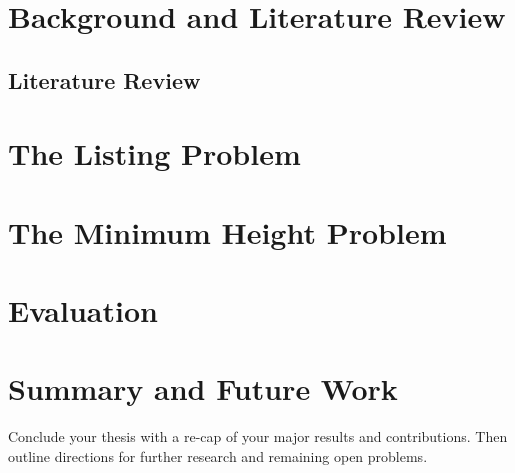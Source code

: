 \chapter{Background and Literature Review}
\label{chapter:background}
 


\section{Literature Review}


\chapter{The Listing Problem}  
\label{chapter:listingproblem}





\chapter{The Minimum Height Problem}
\label{chapter:minheightproblem}



\chapter{Evaluation}  
\label{chapter:evaluation}



\chapter{Summary and Future Work}
\label{chapter:summary}

Conclude your thesis with a re-cap of your major results and contributions.  Then outline directions for further research and remaining open problems.
